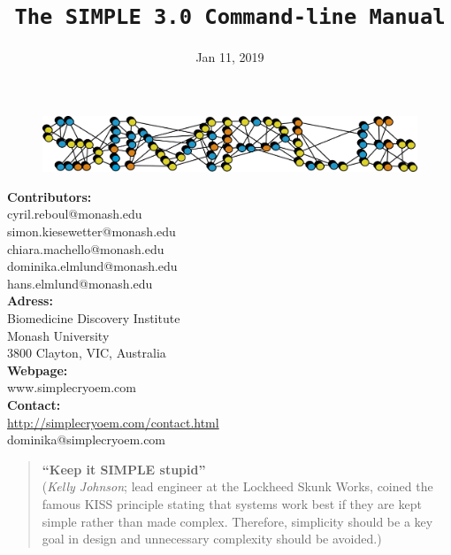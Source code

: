 \documentclass[a4paper,11pt]{article}
\newcommand{\prgname}[1]{\textcolor{NavyBlue}{\texttt{#1}}}
\begin{document}
\begin{figure}
\centering
\includegraphics[keepaspectratio=true,scale=0.6]{../SIMPLE_logo/rawlogo}
\end{figure}


\title{\prgname{The SIMPLE 3.0 Command-line Manual}}
\date{Jan 11, 2019}
\maketitle

\vspace{1em}
\begin{minipage}[ht]{0.50\textwidth}
\textbf{Contributors:}\\
cyril.reboul@monash.edu\\
simon.kiesewetter@monash.edu\\
chiara.machello@monash.edu\\
dominika.elmlund@monash.edu\\
hans.elmlund@monash.edu\\
\textbf{Adress:}\\
Biomedicine Discovery Institute\\
Monash University\\
3800 Clayton, VIC, Australia\\
\textbf{Webpage:}\\
www.simplecryoem.com\\
\textbf{Contact:}\\
\url{http://simplecryoem.com/contact.html}\\
dominika@simplecryoem.com\\
\end{minipage}
\vspace{20pt}

\begin{quote}
\textbf{``Keep it SIMPLE stupid''}\\(\textit{Kelly Johnson}; lead engineer at the Lockheed Skunk Works, coined the famous KISS principle stating that systems work best if they are kept simple rather than made complex. Therefore, simplicity should be a key goal in design and unnecessary complexity should be avoided.)
\end{quote}
\end{document}
